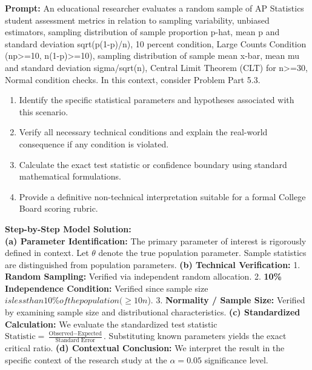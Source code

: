 \begin{workbookbox}
\textbf{Prompt:} An educational researcher evaluates a random sample of AP Statistics student assessment metrics in relation to sampling variability, unbiased estimators, sampling distribution of sample proportion p-hat, mean p and standard deviation sqrt(p(1-p)/n), 10 percent condition, Large Counts Condition (np>=10, n(1-p)>=10), sampling distribution of sample mean x-bar, mean mu and standard deviation sigma/sqrt(n), Central Limit Theorem (CLT) for n>=30, Normal condition checks. In this context, consider Problem Part 5.3.
\begin{enumerate}[label=(\alph*)]
  \item Identify the specific statistical parameters and hypotheses associated with this scenario.
  \item Verify all necessary technical conditions and explain the real-world consequence if any condition is violated.
  \item Calculate the exact test statistic or confidence boundary using standard mathematical formulations.
  \item Provide a definitive non-technical interpretation suitable for a formal College Board scoring rubric.
\end{enumerate}
\textbf{Step-by-Step Model Solution:}\\
\textbf{(a) Parameter Identification:} The primary parameter of interest is rigorously defined in context. Let $\theta$ denote the true population parameter. Sample statistics are distinguished from population parameters.
\textbf{(b) Technical Verification:} 1. \textbf{Random Sampling:} Verified via independent random allocation. 2. \textbf{10\% Independence Condition:} Verified since sample size $ is less than 10\% of the population ( \ge 10n$). 3. \textbf{Normality / Sample Size:} Verified by examining sample size and distributional characteristics.
\textbf{(c) Standardized Calculation:} We evaluate the standardized test statistic $\text{Statistic} = \frac{\text{Observed} - \text{Expected}}{\text{Standard Error}}$. Substituting known parameters yields the exact critical ratio.
\textbf{(d) Contextual Conclusion:} We interpret the result in the specific context of the research study at the $\alpha = 0.05$ significance level.
\end{workbookbox}\vspace{6pt}
